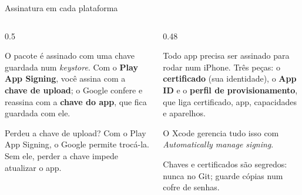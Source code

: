 \begin{frame}{Assinatura em cada plataforma}
  \begin{columns}[T]
    \begin{column}{0.5\textwidth}
      \begin{conceito}[Android]
        O pacote é assinado com uma chave guardada num \emph{keystore}. Com o \textbf{Play App Signing}, você assina com a \textbf{chave de upload}; o Google confere e reassina com a \textbf{chave do app}, que fica guardada com ele.
      \end{conceito}
      \centering
      \begin{dica}
        Perdeu a chave de upload? Com o Play App Signing, o Google permite trocá-la. Sem ele, perder a chave impede atualizar o app.
      \end{dica}
    \end{column}
    \begin{column}{0.48\textwidth}
      \begin{conceito}[iOS]
        Todo app precisa ser assinado para rodar num iPhone. Três peças: o \textbf{certificado} (sua identidade), o \textbf{App ID} e o \textbf{perfil de provisionamento}, que liga certificado, app, capacidades e aparelhos.
      \end{conceito}
      \begin{dica}
        O Xcode gerencia tudo isso com \emph{Automatically manage signing}.
      \end{dica}
      \begin{atencao}
        Chaves e certificados são segredos: nunca no Git; guarde cópias num cofre de senhas.
      \end{atencao}
    \end{column}
  \end{columns}
\end{frame}

